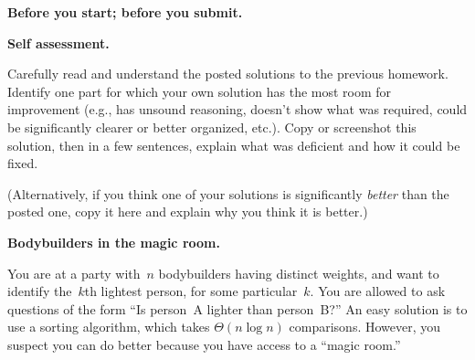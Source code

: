 \documentclass[11pt,addpoints]{exam}
\begin{document}
\hwpreface

\pointsinmargin
{}
\marginpointname{ \points}
\marginbonuspointname{ \bonuspoints}

\begin{questions}
  \addtocounter{question}{-1}
  \question[0] \textbf{Before you start; before you submit.}

  
  \question[10] \textbf{Self assessment.}
  
  Carefully read and understand the posted solutions to the previous homework.
  Identify one part for which your own solution has the most room for improvement (e.g., has unsound reasoning, doesn’t show what was required, could be significantly clearer or better organized, etc.).
  Copy or screenshot this solution, then in a few sentences, explain what was deficient and how it could be fixed.

  (Alternatively, if you think one of your solutions is significantly \emph{better} than the posted one, copy it here and explain why you think it is better.)

  \begin{solution}
      
  \end{solution}

  \question[10] \textbf{Bodybuilders in the magic room.}

  You are at a party with~$n$ bodybuilders having distinct weights, and want to identify the~$k$th lightest person, for some particular~$k$.
  You are allowed to ask questions of the form ``Is person~A lighter than person~B?''
  An easy solution is to use a sorting algorithm, which takes $\Theta(n \log n)$ comparisons.
  However, you suspect you can do better because you have access to a ``magic room.''
  

\end{questions}
\end{document}
